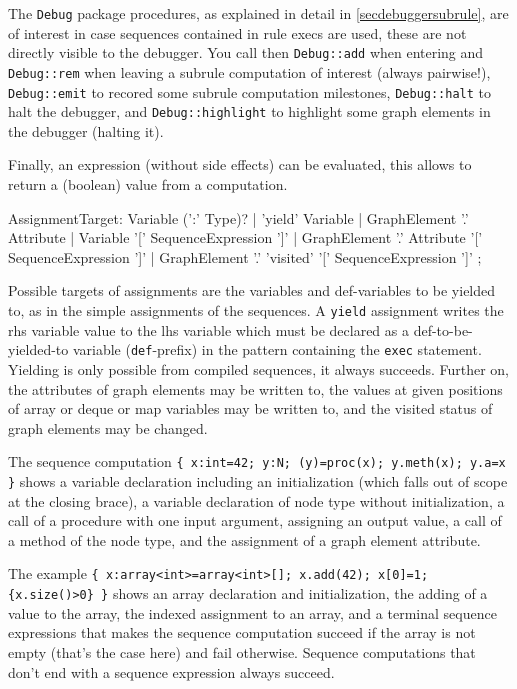 The \texttt{Debug} package procedures, as explained in detail in \ref{secdebuggersubrule}, are of interest in case sequences contained in rule execs are used, these are not directly visible to the debugger.
You call then \texttt{Debug::add} when entering and \texttt{Debug::rem} when leaving a subrule computation of interest (always pairwise!),
\texttt{Debug::emit} to recored some subrule computation milestones, \texttt{Debug::halt} to halt the debugger, and \texttt{Debug::highlight} to highlight some graph elements in the debugger (halting it).

Finally, an expression (without side effects) can be evaluated, this allows to return a (boolean) value from a computation.

\begin{rail}
  AssignmentTarget: 
    Variable (':' Type)? |
    'yield' Variable |
    GraphElement '.' Attribute |
    Variable '[' SequenceExpression ']' |
    GraphElement '.' Attribute '[' SequenceExpression ']' |
    GraphElement '.' 'visited' '[' SequenceExpression ']'
;
\end{rail}

Possible targets of assignments are the variables and def-variables to be yielded to, as in the simple assignments of the sequences. 
A \texttt{yield} assignment writes the rhs variable value to the lhs variable which must be declared as a  def-to-be-yielded-to variable (\texttt{def}-prefix) in the pattern containing the \texttt{exec} statement.
Yielding is only possible from compiled sequences, it always succeeds.
Further on, the attributes of graph elements may be written to, the values at given positions of array or deque or map variables may be written to, and the visited status of graph elements may be changed.

\begin{example}
The sequence computation \verb#{ x:int=42; y:N; (y)=proc(x); y.meth(x); y.a=x }# shows a variable declaration including an initialization (which falls out of scope at the closing brace), a variable declaration of node type without initialization, a call of a procedure with one input argument, assigning an output value, a call of a method of the node type, and the assignment of a graph element attribute.

The example \verb#{ x:array<int>=array<int>[]; x.add(42); x[0]=1; {x.size()>0} }# shows an array declaration and initialization, the adding of a value to the array, the indexed assignment to an array, and a terminal sequence expressions that makes the sequence computation succeed if the array is not empty (that's the case here) and fail otherwise. Sequence computations that don't end with a sequence expression always succeed.
\end{example}

